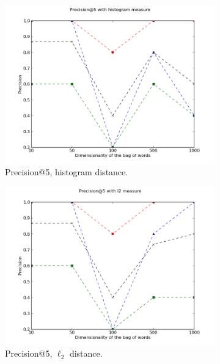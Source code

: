 \documentclass[a4paper,10pt,twoside]{article}
\begin{document}
\begin{figure}
  \begin{subfigure}{0.47\textwidth}
    \centering
    \includegraphics[width=\textwidth]{p5h}
    \caption{Precision@5, histogram distance.}
  \end{subfigure}
  \hspace*{\fill}
  \begin{subfigure}{0.47\textwidth}
    \centering
    \includegraphics[width=\textwidth]{p5l}
    \caption{Precision@5, $\ell_2$ distance.}
  \end{subfigure}
  \begin{subfigure}{0.47\textwidth}
    \centering

\end{subfigure}
\end{figure}
\end{document}
